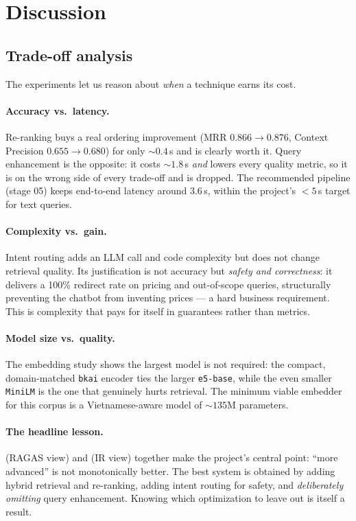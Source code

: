 \section{Discussion}
\label{sec:discussion}

\subsection{Trade-off analysis}
The experiments let us reason about \emph{when} a technique earns its cost.

\paragraph{Accuracy vs.\ latency.}
Re-ranking buys a real ordering improvement (MRR $0.866\!\to\!0.876$, Context
Precision $0.655\!\to\!0.680$) for only ${\sim}0.4$\,s and is clearly worth it.
Query enhancement is the opposite: it costs ${\sim}1.8$\,s \emph{and} lowers
every quality metric, so it is on the wrong side of every trade-off and is
dropped. The recommended pipeline (stage 05) keeps end-to-end latency around
$3.6$\,s, within the project's $<5$\,s target for text queries.

\paragraph{Complexity vs.\ gain.}
Intent routing adds an LLM call and code complexity but does not change retrieval
quality. Its justification is not accuracy but \emph{safety and correctness}: it
delivers a 100\% redirect rate on pricing and out-of-scope queries, structurally
preventing the chatbot from inventing prices --- a hard business requirement.
This is complexity that pays for itself in guarantees rather than metrics.

\paragraph{Model size vs.\ quality.}
The embedding study shows the largest model is not required: the compact,
domain-matched \texttt{bkai} encoder ties the larger \texttt{e5-base}, while the
even smaller \texttt{MiniLM} is the one that genuinely hurts retrieval. The
minimum viable embedder for this corpus is a Vietnamese-aware model of
${\sim}135$M parameters.

\paragraph{The headline lesson.}
 (RAGAS view) and  (IR view) together make
the project's central point: ``more advanced'' is not monotonically better. The
best system is obtained by adding hybrid retrieval and re-ranking, adding intent
routing for safety, and \emph{deliberately omitting} query enhancement. Knowing
which optimization to leave out is itself a result.

